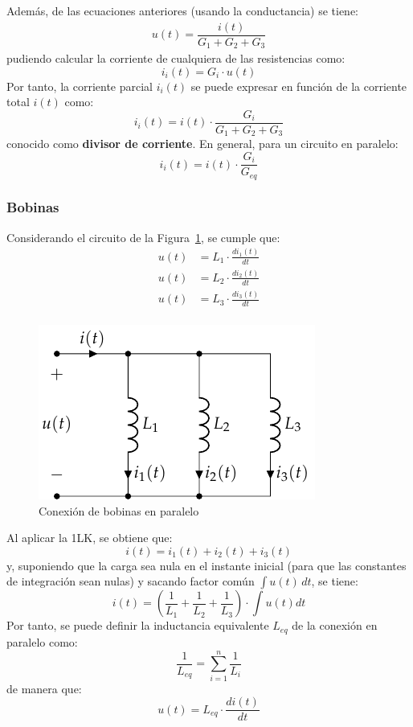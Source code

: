 \documentclass[11pt]{book} %
\begin{document}
		Además, de las ecuaciones anteriores (usando la conductancia) se tiene:
		\begin{align*}
			u(t) = \dfrac{i(t)}{G_1 + G_2 + G_3}
		\end{align*}
		pudiendo calcular la corriente de cualquiera de las resistencias como: 
		\begin{equation*}
			i_i(t) = G_i \cdot u(t)
		\end{equation*}
		Por tanto, la corriente parcial $i_i(t)$ se puede expresar en función de la corriente total $i(t)$ como: 
		\begin{equation*}
			i_i(t) = i(t) \cdot \dfrac{G_i}{G_1 + G_2 + G_3}
		\end{equation*}
		conocido como \textbf{divisor de corriente}. En general, para un circuito en paralelo:
		\begin{equation}
			\boxed{i_i(t) = i(t) \cdot \frac{G_i}{G_{eq}}}
		\end{equation}
		
		\subsubsection{Bobinas}
		
		Considerando el circuito de la Figura~\ref{fig.bobinas-paralelo}, se cumple que:
		\begin{align*}
			u(t) &= L_1 \cdot \frac{di_1(t)}{dt}\\
			u(t) &= L_2 \cdot \frac{di_2(t)}{dt}\\
			u(t) &= L_3 \cdot \frac{di_3(t)}{dt}\\
		\end{align*}
		\begin{figure}[htbp]
			\centering
			\includegraphics[width=0.35\linewidth]{../figs/BobinasParalelo.pdf}
			\caption{Conexión de bobinas en paralelo}
			\label{fig.bobinas-paralelo}
		\end{figure}
		Al aplicar la 1LK, se obtiene que: 
		\begin{equation*}
			i(t) = i_1(t) + i_2(t) + i_3(t)
		\end{equation*}
		y, suponiendo que la carga sea nula en el instante inicial (para que las constantes de integración sean nulas) y sacando factor común $\int u(t)\,dt$, se tiene:
		\begin{equation*}
			i(t)=\left(\dfrac{1}{L_1}+\dfrac{1}{L_2}+\dfrac{1}{L_3} \right)\cdot \int u(t) dt
		\end{equation*}
		Por tanto, se puede definir la inductancia equivalente $L_{eq}$ de la conexión en paralelo como:
		\begin{equation}
			\boxed{\dfrac{1}{L_{eq}} = \sum_{i = 1}^n \dfrac{1}{L_i}}
		\end{equation}
		de manera que:
		\begin{equation*}
			u(t) = L_{eq} \cdot \dfrac{di(t)}{dt}
		\end{equation*}
\end{document}
